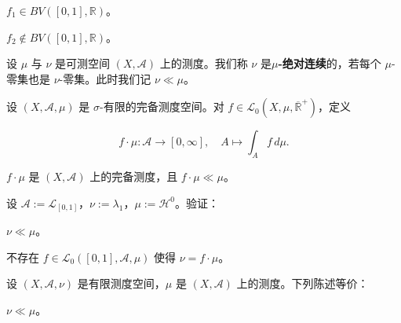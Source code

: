 \begin{exercises}
\begin{items}
\item

$ f_1 \in BV([0,1],\mathbb{R}) $。

\item

$ f_2 \notin BV([0,1],\mathbb{R}) $。

\end{items}

\item

设 $ \mu $ 与 $ \nu $ 是可测空间 $ (X,\mathcal{A}) $ 上的测度。我们称 $ \nu $ 是\textbf{$ \mu $-绝对连续}的，若每个 $ \mu $-零集也是 $ \nu $-零集。此时我们记 $ \nu \ll \mu $。

\begin{items}
\item

设 $ (X,\mathcal{A},\mu) $ 是 $ \sigma $-有限的完备测度空间。对 $ f \in \mathcal{L}_0(X,\mu,\overline{\mathbb{R}}^+) $，定义

\[
f \cdot \mu: \mathcal{A} \to [0,\infty], \quad A \mapsto \int_A f \, d\mu .
\]

\proofhead
$ f \cdot \mu $ 是 $ (X,\mathcal{A}) $ 上的完备测度，且 $ f \cdot \mu \ll \mu $。
\item

设 $ \mathcal{A} := \mathcal{L}_{[0,1]} $，$ \nu := \lambda_1 $，$ \mu := \mathcal{H}^0 $。验证：

\end{items}

\begin{subitems}
\item

$ \nu \ll \mu $。

\item

不存在 $ f \in \mathcal{L}_0([0,1],\mathcal{A},\mu) $ 使得 $ \nu = f \cdot \mu $。

\end{subitems}

\item

设 $ (X,\mathcal{A},\nu) $ 是有限测度空间，$ \mu $ 是 $ (X,\mathcal{A}) $ 上的测度。下列陈述等价：

\begin{subitems}
\item

$ \nu \ll \mu $。

\item


\end{subitems}
\end{exercises}
